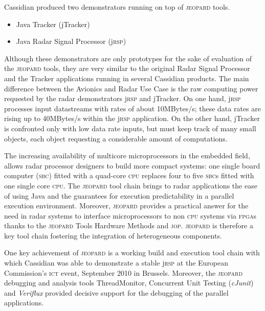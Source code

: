 \documentclass{sig-alternate}
\newcommand{\acronym}[1]{\textsc{#1}}
\begin{document}

Cassidian produced two demonstrators running on top of \acronym{jeopard} tools.
\begin{itemize}
\item Java Tracker (jTracker)
\item Java Radar Signal Processor (j\acronym{rsp})
\end{itemize}
Although these demonstrators are only prototypes for the sake of evaluation of the \acronym{jeopard} tools, they are very similar to the original Radar Signal Processor and the Tracker applications running in several Cassidian products. The main difference between the Avionics and Radar Use Case is the raw computing power requested by the radar demonstrators j\acronym{rsp} and jTracker. On one hand, j\acronym{rsp} processes input datastreams with rates of about 10MBytes/s; these data rates are rising up to 40MBytes/s within the j\acronym{rsp} application. On the other hand, jTracker is confronted only with low data rate inputs, but must keep track of many small objects, each object requesting a considerable amount of computations.  

The increasing availability of multicore microprocessors in the embedded field, allows radar processor designers to build more compact systems: one single board computer (\acronym{sbc}) fitted with a quad-core \acronym{cpu} replaces four to five \acronym{sbc}s fitted with one single core \acronym{cpu}. The \acronym{jeopard} tool chain brings to radar applications the ease of using Java and the guarantees for execution predictability in a parallel execution environment. Moreover, \acronym{jeopard} provides a practical answer for the need in radar systems to interface microprocessors to non \acronym{cpu} systems via \acronym{fpga}s thanks to the \acronym{jeopard} Tools Hardware Methods and \acronym{jop}. \acronym{jeopard} is therefore a key tool chain fostering the integration of heterogeneous components.

One key achievement of \acronym{jeopard} is a working build 
and execution tool chain 
with which Cassidian was able to de\-mon\-stra\-te a stable j\acronym{rsp} at the 
European Commission's \acronym{ict} event, September 2010 in Brussels. 
Moreover, the \acronym{jeopard} debugging and analysis tools ThreadMonitor, 
Concurrent Unit Testing (\emph{cJunit}) and \emph{Veriflux} provided 
decisive support for the debugging of the parallel applications. 
\end{document}

